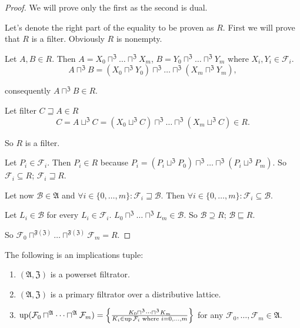 \begin{proof}
We will prove only the first as the second is dual.

Let's denote the right part of the equality to be proven as $R$.
First we will prove that $R$ is a filter. Obviously $R$ is nonempty.

Let $A,B\in R$. Then $A=X_{0}\sqcap^{\mathfrak{Z}}\dots\sqcap^{\mathfrak{Z}}X_{m}$,
$B=Y_{0}\sqcap^{\mathfrak{Z}}\dots\sqcap^{\mathfrak{Z}}Y_{m}$ where
$X_{i},Y_{i}\in\mathcal{F}_{i}$.
\[
A\sqcap^{\mathfrak{Z}}B=(X_{0}\sqcap^{\mathfrak{Z}}Y_{0})\sqcap^{\mathfrak{Z}}\dots\sqcap^{\mathfrak{Z}}(X_{m}\sqcap^{\mathfrak{Z}}Y_{m}),
\]


consequently $A\sqcap^{\mathfrak{Z}}B\in R$.

Let filter $C\sqsupseteq A\in R$
\[
C=A\sqcup^{\mathfrak{Z}}C=(X_{0}\sqcup^{\mathfrak{Z}}C)\sqcap^{\mathfrak{Z}}\dots\sqcap^{\mathfrak{Z}}(X_{m}\sqcup^{\mathfrak{Z}}C)\in R.
\]


So $R$ is a filter.

Let $P_{i}\in\mathcal{F}_{i}$. Then $P_{i}\in R$ because $P_{i}=(P_{i}\sqcup^{\mathfrak{Z}}P_{0})\sqcap^{\mathfrak{Z}}\dots\sqcap^{\mathfrak{Z}}(P_{i}\sqcup^{\mathfrak{Z}}P_{m})$.
So $\mathcal{F}_{i}\subseteq R$; $\mathcal{F}_{i}\sqsupseteq R$.

Let now $\mathcal{B}\in\mathfrak{A}$ and $\forall i\in\{0,\dots,m\}:\mathcal{F}_{i}\sqsupseteq\mathcal{B}$.
Then $\forall i\in\{0,\dots,m\}:\mathcal{F}_{i}\subseteq\mathcal{B}$.

Let $L_{i}\in\mathcal{B}$ for every $L_{i}\in\mathcal{F}_{i}$. $L_{0}\sqcap^{\mathfrak{Z}}\dots\sqcap^{\mathfrak{Z}}L_{m}\in\mathcal{B}$.
So $\mathcal{B}\supseteq R$; $\mathcal{B}\sqsubseteq R$.

So $\mathcal{F}_{0}\sqcap^{\mathfrak{F}(\mathfrak{Z})}\dots\sqcap^{\mathfrak{F}(\mathfrak{Z})}\mathcal{F}_{m}=R$.\end{proof}
\begin{cor}
\label{f-fin-filt-meet}The following is an implications tuple:
\begin{enumerate}
\item \label{f-fin-filt-meet-p}$(\mathfrak{A},\mathfrak{Z})$ is a powerset
filtrator.
\item \label{fin-filt-meet-fltr}$(\mathfrak{A},\mathfrak{Z})$ is a primary
filtrator over a distributive lattice.
\item \label{fin-filt-meet-conc}$\operatorname{up}(\mathcal{F}_{0}\sqcap^{\mathfrak{A}}\dots\sqcap^{\mathfrak{A}}\mathcal{F}_{m})=\left\{ \frac{K_{0}\sqcap^{\mathfrak{Z}}\dots\sqcap^{\mathfrak{Z}}K_{m}}{K_{i}\in\operatorname{up}\mathcal{F}_{i}\text{ where }i=0,\dots,m}\right\}$
for any $\mathcal{F}_{0},\dots,\mathcal{F}_{m}\in\mathfrak{A}$.
\end{enumerate}
\end{cor}
